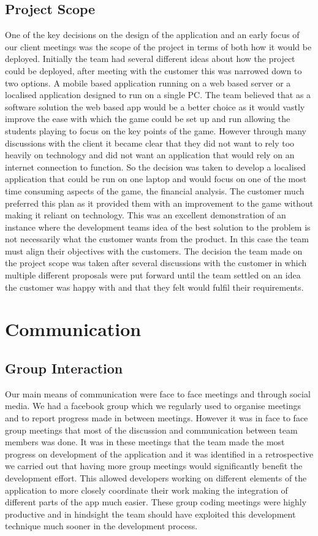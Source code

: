 \documentclass{l3proj}
\begin{document}
\subsection{Project Scope}
One of the key decisions on the design of the application and an early focus of our client meetings was the scope of the project in terms of both how it would be deployed. Initially the team had several different ideas about how the project could be deployed, after meeting with the customer this was narrowed down to two options. A mobile based application running on a web based server or a localised application designed to run on a single PC. The team believed that as a software solution the web based app would be a better choice as it would vastly improve the ease with which the game could be set up and run allowing the students playing to focus on the key points of the game. However through many discussions with the client it became clear that they did not want to rely too heavily on technology and did not want an application that would rely on an internet connection to function. So the decision was taken to develop a localised application that could be run on one laptop and would focus on one of the most time consuming aspects of the game, the financial analysis. The customer much preferred this plan as it provided them with an improvement to the game without making it reliant on technology. This was an excellent demonstration of an instance where the development teams idea of the best solution to the problem is not necessarily what the customer wants from the product. In this case the team must align their objectives with the customers. The decision the team made on the project scope was taken after several discussions with the customer in which multiple different proposals were put forward until the team settled on an idea the customer was happy with and that they felt would fulfil their requirements.
\section{Communication}
\label{sec:communication}

\subsection{Group Interaction}
Our main means of communication were face to face meetings and through social media. We had a facebook group which we regularly used to organise meetings and to report progress made in between meetings. However it was in face to face group meetings that most of the discussion and communication between team members was done. It was in these meetings that the team made the most progress on development of the application and it was identified in a retrospective we carried out that having more group meetings would significantly benefit the development effort. This allowed developers working on different elements of the application to more closely coordinate their work making the integration of different parts of the app much easier. These group coding meetings were highly productive and in hindsight the team should have exploited this development technique much sooner in the development process.
\end{document}

